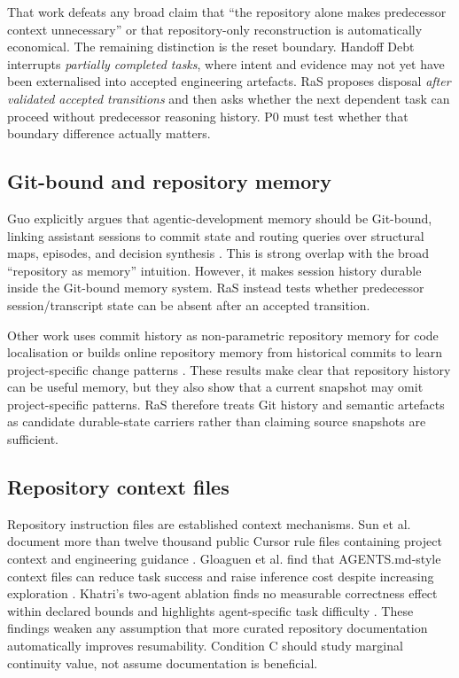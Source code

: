 That work defeats any broad claim that “the repository alone makes predecessor context unnecessary” or that repository-only reconstruction is automatically economical. The remaining distinction is the reset boundary. Handoff Debt interrupts \emph{partially completed tasks}, where intent and evidence may not yet have been externalised into accepted engineering artefacts. RaS proposes disposal \emph{after validated accepted transitions} and then asks whether the next dependent task can proceed without predecessor reasoning history. P0 must test whether that boundary difference actually matters.

\subsection{Git-bound and repository memory}

Guo explicitly argues that agentic-development memory should be Git-bound, linking assistant sessions to commit state and routing queries over structural maps, episodes, and decision synthesis \citep{guo2026gitmemory}. This is strong overlap with the broad “repository as memory” intuition. However, it makes session history durable inside the Git-bound memory system. RaS instead tests whether predecessor session/transcript state can be absent after an accepted transition.

Other work uses commit history as non-parametric repository memory for code localisation \citep{wang2025repomemory} or builds online repository memory from historical commits to learn project-specific change patterns \citep{li2026learningcommit}. These results make clear that repository history can be useful memory, but they also show that a current snapshot may omit project-specific patterns. RaS therefore treats Git history and semantic artefacts as candidate durable-state carriers rather than claiming source snapshots are sufficient.

\subsection{Repository context files}

Repository instruction files are established context mechanisms. Sun et al. document more than twelve thousand public Cursor rule files containing project context and engineering guidance \citep{sun2026cursorrules}. Gloaguen et al. find that AGENTS.md-style context files can reduce task success and raise inference cost despite increasing exploration \citep{gloaguen2026agentsmd}. Khatri's two-agent ablation finds no measurable correctness effect within declared bounds and highlights agent-specific task difficulty \citep{khatri2026contextfiles}. These findings weaken any assumption that more curated repository documentation automatically improves resumability. Condition C should study marginal continuity value, not assume documentation is beneficial.

